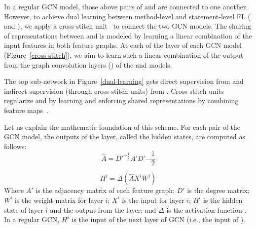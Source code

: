  In a regular GCN
model, those above pairs of  and  are connected
to one another. However, to achieve dual learning between method-level
and state\-ment-level FL ( and ), we apply a
cross-stitch unit~\cite{misra2016cross} to connect the two GCN
models. The sharing of representations between  and
 is modeled by learning a linear combination of the input
features in both feature graphs. At each of the  layer of
each GCN model (Figure~\ref{cross-stitch}), we aim to learn such a
linear combination of the output from the graph convolution layers
() of the  and  models.

The top sub-network in Figure~\ref{dual-learning} gets direct
supervision from  and indirect supervision (through
cross-stitch units) from . Cross-stitch units regularize
 and  by learning and enforcing shared
representations by combining feature maps~\cite{misra2016cross}.



 Let us explain the mathematic foundation
of this scheme. For each pair of the GCN model, the outputs of the
 layer, called the hidden states, are computed as follows:
\begin{equation}\label{eq:1}
	\hat{A} = D'^{-\frac{1}{2}}A'D'{-\frac{1}{2}}
\end{equation}

\begin{equation}\label{eq:2}
	H^{i} = \Delta(\hat{A}X^{i}W^{i})
\end{equation}
Where $A'$ is the adjacency matrix of each feature graph; $D'$ is the
degree matrix; $W^{i}$ is the weight matrix for layer $i$; $X^{i}$ is
the input for layer $i$; $H^{i}$ is the hidden state of layer $i$ and
the output from the  layer; and $\Delta$ is the activation
function .
In a regular GCN, $H^{i}$ is the input of the next layer of GCN (i.e.,
the input of ).

